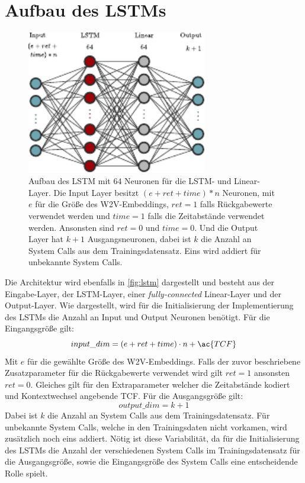     \section{Aufbau des \acp{LSTM}}\label{sec:aufbau_lstm}
        \begin{figure}[ht]
            \centering
            \includegraphics[width=0.7\textwidth]{images/lstm.pdf}
            \caption[Aufbau des \ac{LSTM}]{Aufbau des \ac{LSTM} mit $64$ Neuronen für die \ac{LSTM}- und Linear-Layer.
                Die Input Layer besitzt $(e + ret + time) * n$ Neuronen, mit $e$ für die Größe des \ac{W2V}-Embeddings,
                $ret=1$ falls Rückgabewerte verwendet werden und $time=1$ falls die Zeitabstände verwendet werden.
                Ansonsten sind $ret=0$ und $time=0$.
                Und die Output Layer hat $k+1$ Ausgangsneuronen, dabei ist $k$ die Anzahl an System Calls aus dem Trainingsdatensatz.
                Eins wird addiert für unbekannte System Calls.}
                \label{fig:lstm}
        \end{figure}

        Die Architektur wird ebenfalls in \autoref{fig:lstm} dargestellt und besteht aus der Eingabe-Layer, der \ac{LSTM}-Layer, einer \textit{fully-connected} Linear-Layer und der Output-Layer.
        Wie dargestellt, wird für die Initialisierung der Implementierung des \acp{LSTM} die Anzahl an Input und Output Neuronen benötigt.
        Für die Eingangsgröße gilt:
        \begin{equation}
            input\_dim = (e + ret + time) \cdot n + \ac{TCF}
        \end{equation}
        Mit $e$ für die gewählte Größe des \ac{W2V}-Embeddings.
        Falls der zuvor beschriebene Zusatzparameter für die Rückgabewerte verwendet wird gilt $ret=1$ ansonsten $ret=0$.
        Gleiches gilt für den Extraparameter welcher die Zeitabstände kodiert und Kontextwechsel angebende \ac{TCF}.
        Für die Ausgangsgröße gilt:
        \begin{equation}
            output\_dim = k + 1
        \end{equation}
        Dabei ist $k$ die Anzahl an System Calls aus dem Trainingsdatensatz.
        Für unbekannte System Calls, welche in den Trainingsdaten nicht vorkamen, wird zusätzlich noch eins addiert.
        Nötig ist diese Variabilität, da für die Initialisierung des \acp{LSTM} die Anzahl der verschiedenen System Calls im Trainingsdatensatz für die Ausgangsgröße, sowie die Eingangsgröße des System Calls eine entscheidende Rolle spielt.

